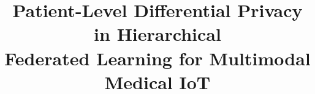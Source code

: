 \documentclass[journal]{IEEEtran}
\begin{document}
\title{Patient-Level Differential Privacy in Hierarchical\\
       Federated Learning for Multimodal Medical IoT}

\newif\ifcollegeauthors
\collegeauthorstrue    %
\ifcollegeauthors
\end{document}
